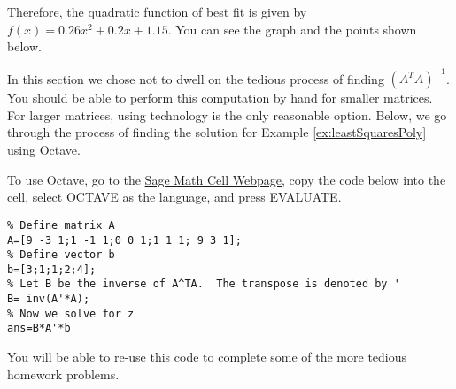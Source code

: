 \documentclass{ximera}
\begin{document}
\begin{example}
\begin{explanation}
    Therefore, the quadratic function of best fit is given by $f(x)=0.26x^2+0.2x+1.15$.  You can see the graph and the points shown below.

\begin{onlineOnly}
\begin{center}
\end{center}
\end{onlineOnly}

 
\end{explanation}
 \end{example}

In this section we chose not to dwell on the tedious process of finding $\left(A^TA\right)^{-1}$.  You should be able to perform this computation by hand for smaller matrices.  For larger matrices, using technology is the only reasonable option.  Below, we go through the process of finding the solution for Example \ref{ex:leastSquaresPoly} using Octave.

To use Octave, go to the \href{https://sagecell.sagemath.org/}{Sage Math Cell Webpage}, copy the code below into the cell, select OCTAVE as the language, and press EVALUATE.

\begin{verbatim}
% Define matrix A
A=[9 -3 1;1 -1 1;0 0 1;1 1 1; 9 3 1];
% Define vector b
b=[3;1;1;2;4];
% Let B be the inverse of A^TA.  The transpose is denoted by '
B= inv(A'*A);
% Now we solve for z
ans=B*A'*b
\end{verbatim}

You will be able to re-use this code to complete some of the more tedious homework problems.
\end{document}
